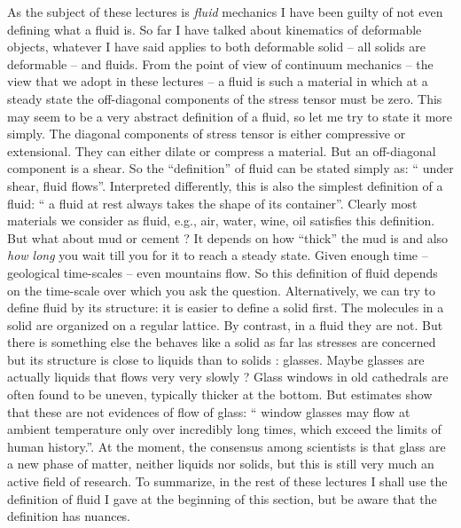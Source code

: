 As the subject of these lectures is \textit{fluid} mechanics I have been
guilty of not even defining what a fluid is. So far I have talked about
kinematics of deformable objects, whatever I have said applies to both
deformable solid -- all solids are deformable -- and fluids. From the
point of view of continuum mechanics -- the view that we adopt in
these lectures -- a fluid is such a material in which at a steady
state the off-diagonal components of the stress tensor must be
zero. This may seem to be a very abstract definition of a fluid, so
let me try to state it more simply. The diagonal components of stress
tensor is  either compressive or extensional. They can either dilate or
compress a material. But an off-diagonal component is a shear.
So the ``definition'' of fluid can be stated simply as: `` under shear,
fluid flows''. Interpreted differently, this is also the simplest
definition of a fluid: `` a fluid at rest always takes the shape of
its container''.  Clearly most materials we consider as fluid, e.g.,  air,
water, wine, oil satisfies this definition. But what about mud or
cement ? It depends on how ``thick'' the mud is and also \textit{ how
  long} you wait till you for it to reach a steady state. Given enough
time -- geological time-scales -- even mountains flow. 
So this definition of fluid depends on the time-scale over which you ask
the question.  Alternatively, we can try to define fluid by its
structure: it is easier to define a solid first. The molecules in a
solid are organized on a regular lattice. By contrast, in a fluid they
are not. But there is something else the behaves like a solid as far
las stresses are concerned but its structure is close to liquids than
to solids : glasses.  Maybe glasses are actually liquids that flows
very very slowly ? Glass windows in old cathedrals are often found to
be uneven, typically thicker at the bottom. But estimates show that 
these are not evidences of flow of glass: `` window glasses may flow 
at ambient temperature only over incredibly long times, 
which exceed the limits of human
history.''\cite{zanotto1998cathedral,zanotto1999cathedral}. 
At the moment, the consensus among scientists is that glass are a
new phase of matter, neither liquids nor solids, but this is still
very much an active field of research. 
To summarize, in the rest of these lectures I shall use the definition of fluid I gave at the
beginning of this section, but be aware that the definition has
nuances. 

